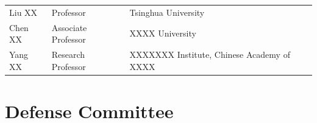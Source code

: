 \begin{committee}[name={List of the Thesis Supervision Committee, Public Reviewers, and Defense Committee}]
  \begin{center}
    \begin{tabular}{C{3cm}C{3cm}C{9cm}@{}}
      Liu XX  & Professor           & Tsinghua University                         \\
      Chen XX & Associate Professor & XXXX University                             \\
      Yang XX & Research Professor  & XXXXXXX Institute, Chinese Academy of XXXX \\
    \end{tabular}
  \end{center}


  \section*{Defense Committee}


\end{committee}
